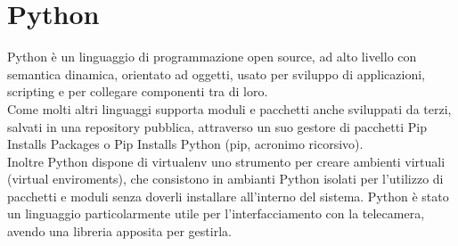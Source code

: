 \section{Python}
Python è un linguaggio di programmazione open source, ad alto livello con semantica dinamica, orientato ad oggetti, usato
per sviluppo di applicazioni, scripting e per collegare componenti tra di loro.\\[1\baselineskip]
Come molti altri linguaggi supporta moduli e pacchetti anche sviluppati da terzi, salvati in una repository pubblica,
attraverso un suo gestore di pacchetti Pip Installs Packages o Pip Installs Python (pip, acronimo ricorsivo).
\\[1\baselineskip]
Inoltre Python dispone di virtualenv uno strumento per creare ambienti virtuali (virtual enviroments), che consistono in ambianti Python
isolati per l'utilizzo di pacchetti e moduli senza doverli installare all'interno del sistema.
Python è stato un linguaggio particolarmente utile per l'interfacciamento con la telecamera, avendo una libreria
apposita per gestirla.

